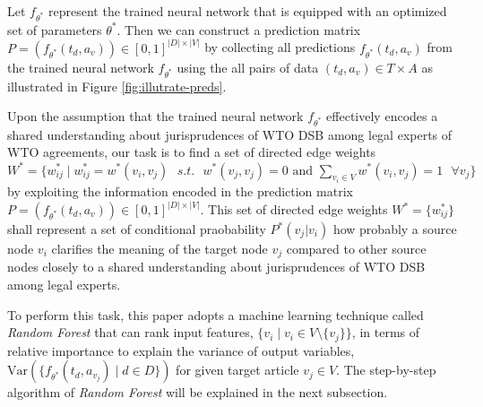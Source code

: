 Let $f_{\theta^*}$ represent the trained neural network that is equipped with an optimized set of parameters $\theta^*$. 
Then we can construct a prediction matrix $P = (f_{\theta^*}(t_d, a_v)) \in [0,1]^{{|D| \times |V|}}$  by collecting all predictions $f_{\theta^*}(t_d, a_v)$ from the trained neural network $f_{\theta^{*}}$ using the all pairs of data $(t_d,a_v) \in T \times A$ as illustrated in Figure \ref{fig:illutrate-preds}.

Upon the assumption that the trained neural network $f_{\theta^*}$ effectively encodes a shared understanding about jurisprudences of WTO DSB among legal experts of WTO agreements, our task is to find a set of directed edge weights $W^* = \{w^{*}_{ij} \mid w^{*}_{ij} = w^{*}(v_i, v_j) \text{ } s.t. \text{ } w^{*}(v_j, v_j) = 0 \text{ and } \sum_{v_i\in V}{w^{*}(v_i, v_j)} = 1 \text{ } \forall v_j \}$ %
by exploiting the information encoded in the prediction matrix $P = (f_{\theta^*}(t_d, a_v)) \in [0,1]^{{|D| \times |V|}}$. This set of directed edge weights $W^{*} = \{w^{*}_{ij}\}$ shall represent a set of conditional praobability $P^{*}(v_j|v_i)$ how probably a source node $v_i$ clarifies the meaning of the target node $v_j$ compared to other source nodes
closely to a shared understanding about jurisprudences of WTO DSB among legal experts. %

To perform this task, this paper adopts a machine learning technique called \textit{Random Forest} that can rank input features, $\{v_i \mid v_i \in V \setminus \{v_j\}\}$, in terms of relative importance to explain the variance of output variables, $\text{Var}(\{f_{\theta^*}(t_d, a_{v_j}) \mid d \in D \})$ for given target article $v_j \in V$. The step-by-step algorithm of \textit{Random Forest} will be explained in the next subsection.


